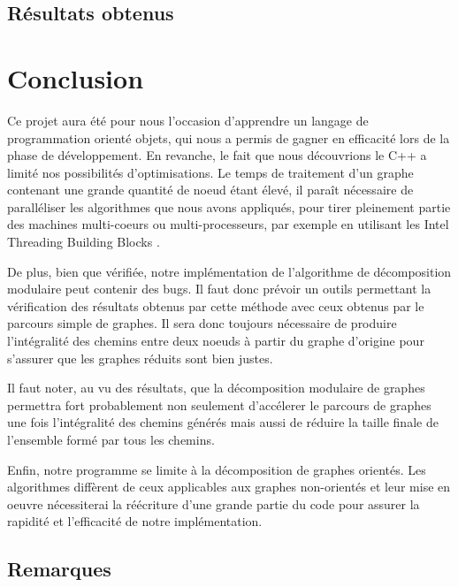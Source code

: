 \documentclass[pdftex,a4paper,titlepage,11pt,openright]{article}
\newcommand{\clearemptydoublepage}{
	\newpage{\pagestyle{empty}\cleardoublepage}}
\begin{document}
\newpage

\subsection{Résultats obtenus}

\newpage

\clearemptydoublepage

\section*{Conclusion} 

Ce projet aura été pour nous l'occasion d'apprendre un langage de programmation orienté objets, qui nous a permis de gagner en efficacité lors de la phase de développement. En revanche, le fait que nous découvrions le C++ a limité nos possibilités d'optimisations. Le temps de traitement d'un graphe contenant une grande quantité de noeud étant élevé, il paraît nécessaire de paralléliser les algorithmes que nous avons appliqués, pour tirer pleinement partie des machines multi-coeurs ou multi-processeurs, par exemple en utilisant les Intel Threading Building Blocks \cite{IBMRBST}.

De plus, bien que vérifiée, notre implémentation de l'algorithme de décomposition modulaire peut contenir des bugs. Il faut donc prévoir un outils permettant la vérification des résultats obtenus par cette méthode avec ceux obtenus par le parcours simple de graphes. Il sera donc toujours nécessaire de produire l'intégralité des chemins entre deux noeuds à partir du graphe d'origine pour s'assurer que les graphes réduits sont bien justes.

Il faut noter, au vu des résultats, que la décomposition modulaire de graphes permettra fort probablement non seulement d'accélerer le parcours de graphes une fois l'intégralité des chemins générés mais aussi de réduire la taille finale de l'ensemble formé par tous les chemins.

Enfin, notre programme se limite à la décomposition de graphes orientés. Les algorithmes diffèrent de ceux applicables aux graphes non-orientés et leur mise en oeuvre nécessiterai la réécriture d'une grande partie du code pour assurer la rapidité et l'efficacité de notre implémentation.


\newpage
{}
\subsection*{Remarques}
\end{document}
